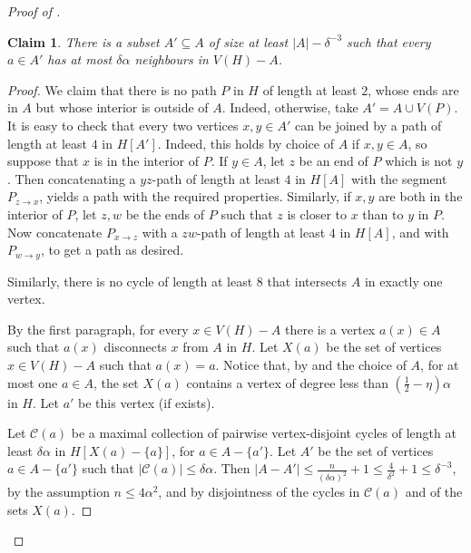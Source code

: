 \documentclass[11pt,english]{article}
\theoremstyle{plain}
\newtheorem{claim}[theorem]{Claim}
\theoremstyle{definition}
\theoremstyle{remark}
\newcommand{\cC}{\mathcal{C}}
\begin{document}
\begin{proof}[Proof of ]
			\begin{claim} \label{claim:A-edges}
				There is a subset $A' \subseteq A$ of size at least $|A| - \delta^{-3}$ such that every $a \in A'$ has at most $\delta \alpha$ neighbours in $V(H) - A$.
			\end{claim}

			\begin{proof}
				We claim that there is no path $P$ in $H$ of length at least $2$, whose ends are in $A$ but whose interior is outside of $A$. Indeed, otherwise, take $A' = A \cup V(P)$. It is easy to check that every two vertices $x, y \in A'$ can be joined by a path of length at least $4$ in $H[A']$. Indeed, this holds by choice of $A$ if $x,y \in A$, so suppose that $x$ is in the interior of $P$. If $y \in A$, let $z$ be an end of $P$ which is not $y$. Then concatenating a $yz$-path of length at least $4$ in $H[A]$ with the segment $P_{z \to x}$, yields a path with the required properties. 
				Similarly, if $x,y$ are both in the interior of $P$, let $z, w$ be the ends of $P$ such that $z$ is closer to $x$ than to $y$ in $P$. Now concatenate $P_{x \to z}$ with a $zw$-path of length at least $4$ in $H[A]$, and with $P_{w \to y}$, to get a path as desired.

				Similarly, there is no cycle of length at least $8$ that intersects $A$ in exactly one vertex.

				By the first paragraph, for every $x \in V(H) - A$ there is a vertex $a(x) \in A$ such that $a(x)$ disconnects $x$ from $A$ in $H$. Let $X(a)$ be the set of vertices $x \in V(H) - A$ such that $a(x) = a$.
				Notice that, by  and the choice of $A$, for at most one $a \in A$, the set $X(a)$ contains a vertex of degree less than $(\frac{1}{2} - \eta)\alpha$ in $H$. Let $a'$ be this vertex (if exists).

				Let $\cC(a)$ be a maximal collection of pairwise vertex-disjoint cycles of length at least $\delta \alpha$ in $H[X(a) - \{a\}]$, for $a \in A - \{a'\}$. Let $A'$ be the set of vertices $a \in A - \{a'\}$ such that $|\cC(a)| \le \delta \alpha$. Then $|A - A'| \le \frac{n}{(\delta \alpha)^2} + 1 \le \frac{4}{\delta^2} + 1 \le \delta^{-3}$, by the assumption $n \le 4\alpha^2$, and by disjointness of the cycles in $\cC(a)$ and of the sets $X(a)$. 
				

\end{proof}
\end{proof}
\end{document}
